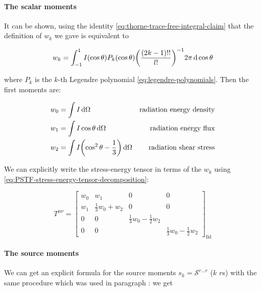 \documentclass[main.tex]{subfiles}
\begin{document}
\paragraph{The scalar moments} \label{par:scalar-moments}

It can be shown, using the identity \eqref{eq:thorne-trace-free-integral-claim}  that the definition of \(w_k\) we gave is equivalent to

\begin{equation}
    w_k = \int_{-1}^1 I(\cos \theta) P_k(\cos \theta) \qty(\frac{(2k-1)!!}{l!})^{-1} 2 \pi\dd{\cos \theta}
\end{equation}

where \(P_k\) is the \(k\)-th Legendre polynomial \eqref{eq:legendre-polynomials}.
Then the first moments are:

\begin{subequations}
\begin{align}
  w_0 &= \int I \dd{\Omega} & \text{radiation energy density} \\
  w_1 &= \int I \cos \theta \dd{\Omega} & \text{radiation energy flux} \\
  w_2 &= \int I \qty(\cos^2 \theta - \frac{1}{3}) \dd{\Omega} & \text{radiation shear stress}
\end{align}
\end{subequations}

We can explicitly write the stress-energy tensor in terms of the \(w_k\) using \eqref{eq:PSTF-stress-energy-tensor-decomposition}:

\begin{equation} \label{eq:radiation-stress-energy-tensor-fiducial}
    T^{\mu\nu} = \begin{bmatrix}
    w_0   & w_1  & 0  & 0 \\
    w_1   & \frac{1}{3}w_0 + w_2  &  0  & 0 \\
      0 & 0  &  \frac{1}{3}w_0 -\frac{1}{2}w_2 &  \\
      0 & 0  &   & \frac{1}{3}w_0 -\frac{1}{2}w_2
  \end{bmatrix} _{\text{fid}}
\end{equation}

\paragraph{The source moments}

We can get an explicit formula for the source moments \(s_k = \mathscr S ^{r\dots r}\) (\(k\) \(r\)s) with the same procedure which was used in paragraph :
we get
\end{document}
